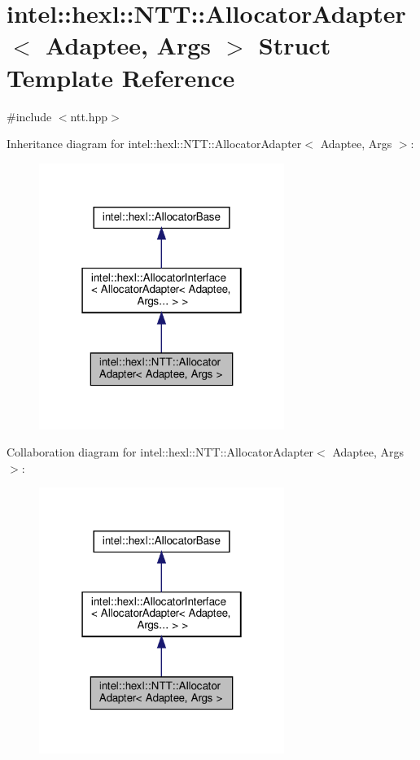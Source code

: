 \hypertarget{structintel_1_1hexl_1_1NTT_1_1AllocatorAdapter}{}\section{intel\+:\+:hexl\+:\+:N\+TT\+:\+:Allocator\+Adapter$<$ Adaptee, Args $>$ Struct Template Reference}
\label{structintel_1_1hexl_1_1NTT_1_1AllocatorAdapter}


{\ttfamily \#include $<$ntt.\+hpp$>$}



Inheritance diagram for intel\+:\+:hexl\+:\+:N\+TT\+:\+:Allocator\+Adapter$<$ Adaptee, Args $>$\+:
\nopagebreak
\begin{figure}[H]
\begin{center}
\leavevmode
\includegraphics[width=226pt]{structintel_1_1hexl_1_1NTT_1_1AllocatorAdapter__inherit__graph}
\end{center}
\end{figure}


Collaboration diagram for intel\+:\+:hexl\+:\+:N\+TT\+:\+:Allocator\+Adapter$<$ Adaptee, Args $>$\+:
\nopagebreak
\begin{figure}[H]
\begin{center}
\leavevmode
\includegraphics[width=226pt]{structintel_1_1hexl_1_1NTT_1_1AllocatorAdapter__coll__graph}
\end{center}
\end{figure}
